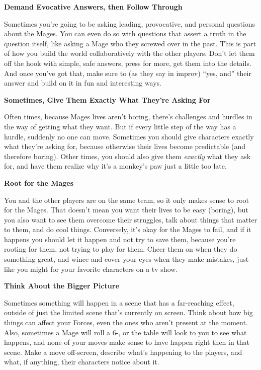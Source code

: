 \documentclass[
  oneside,
  statementpaper,
  9pt]{memoir}
\begin{document}
\textbf{Demand Evocative Answers, then Follow Through}

Sometimes you're going to be asking leading, provocative, and personal
questions about the Mages. You can even do so with questions that assert
a truth in the question itself, like asking a Mage who they screwed over
in the past. This is part of how you build the world collaboratively
with the other players. Don't let them off the hook with simple, safe
answers, press for more, get them into the details. And once you've got
that, make sure to (as they say in improv) ``yes, and'' their answer and
build on it in fun and interesting ways.

\textbf{Sometimes, Give Them Exactly What They're Asking For}

Often times, because Mages lives aren't boring, there's challenges and
hurdles in the way of getting what they want. But if every little step
of the way has a hurdle, suddenly no one can move. Sometimes you should
give characters exactly what they're asking for, because otherwise their
lives become predictable (and therefore boring). Other times, you should
also give them \emph{exactly} what they ask for, and have them realize
why it's a monkey's paw just a little too late.

\textbf{Root for the Mages}

You and the other players are on the same team, so it only makes sense
to root for the Mages. That doesn't mean you want their lives to be easy
(boring), but you also want to see them overcome their struggles, talk
about things that matter to them, and do cool things. Conversely, it's
okay for the Mages to fail, and if it happens you should let it happen
and not try to save them, because you're rooting for them, not trying to
play for them. Cheer them on when they do something great, and wince and
cover your eyes when they make mistakes, just like you might for your
favorite characters on a tv show.

\textbf{Think About the Bigger Picture}

Sometimes something will happen in a scene that has a far-reaching
effect, outside of just the limited scene that's currently on screen.
Think about how big things can affect your Forces, even the ones who
aren't present at the moment. Also, sometimes a Mage will roll a 6-, or
the table will look to you to see what happens, and none of your moves
make sense to have happen right then in that scene. Make a move
off-screen, describe what's happening to the players, and what, if
anything, their characters notice about it.
\end{document}
